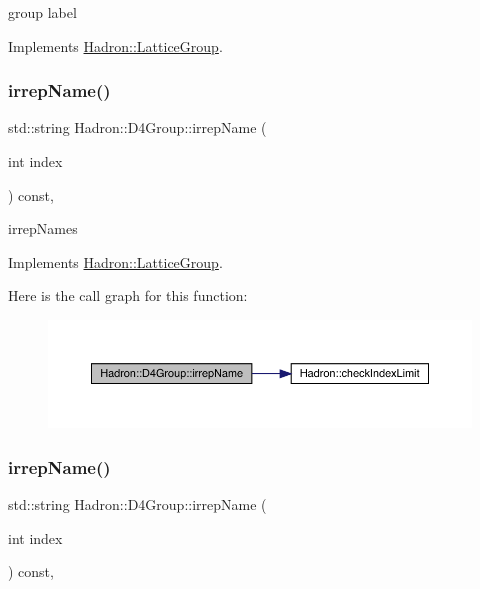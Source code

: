 group label 

Implements \mbox{\hyperlink{structHadron_1_1LatticeGroup_a82208a322bf1b1db489f16af38e70087}{Hadron\+::\+Lattice\+Group}}.

\mbox{\label{structHadron_1_1D4Group_a5f121bd08a7add3ddf660c7e3478cb9e}} 
\subsubsection{\texorpdfstring{irrepName()}{irrepName()}\hspace{0.1cm}{\footnotesize\ttfamily [1/3]}}
{\footnotesize\ttfamily std\+::string Hadron\+::\+D4\+Group\+::irrep\+Name (\begin{DoxyParamCaption}\item[{int}]{index }\end{DoxyParamCaption}) const\hspace{0.3cm}{\ttfamily [inline]}, {\ttfamily [virtual]}}

irrep\+Names 

Implements \mbox{\hyperlink{structHadron_1_1LatticeGroup_a4bc5620218c2a73157e19bc4451fe746}{Hadron\+::\+Lattice\+Group}}.

Here is the call graph for this function\+:
\nopagebreak
\begin{figure}[H]
\begin{center}
\leavevmode
\includegraphics[width=350pt]{de/d5e/structHadron_1_1D4Group_a5f121bd08a7add3ddf660c7e3478cb9e_cgraph}
\end{center}
\end{figure}
\mbox{\label{structHadron_1_1D4Group_a5f121bd08a7add3ddf660c7e3478cb9e}} 
\subsubsection{\texorpdfstring{irrepName()}{irrepName()}\hspace{0.1cm}{\footnotesize\ttfamily [2/3]}}
{\footnotesize\ttfamily std\+::string Hadron\+::\+D4\+Group\+::irrep\+Name (\begin{DoxyParamCaption}\item[{int}]{index }\end{DoxyParamCaption}) const\hspace{0.3cm}{\ttfamily [inline]}, {\ttfamily [virtual]}}

